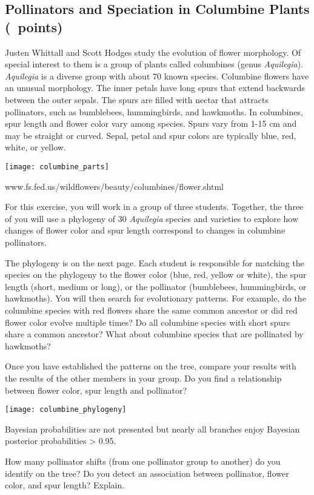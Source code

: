 \documentclass[11pt, addpoints]{exam}
\begin{document}
\subsection*{Pollinators and Speciation in Columbine Plants (\numpoints\ points)}

Justen Whittall and Scott Hodges study the evolution of flower
morphology. Of special interest to them is a group of plants called
columbines (genus \textit{Aquilegia}). \textit{Aquilegia} is a diverse group
with about 70 known species. Columbine flowers have an unusual
morphology. The inner petals have long spurs that extend backwards
between the outer sepals. The spurs are filled with nectar that attracts
pollinators, such as bumblebees, hummingbirds, and hawkmoths. In
columbines, spur length and flower color vary among species. Spurs vary from
1-15 cm and may be straight or curved. Sepal, petal and spur colors are
typically blue, red, white, or yellow.

\begin{center}
	\texttt{[image: columbine\_parts]}

	{\footnotesize
	www.fs.fed.us/wildflowers/beauty/columbines/flower.shtml}
\end{center}

For this exercise, you will work in a group of three students. Together,
the three of you will use a phylogeny of 30 \textit{Aquilegia} species and
varieties to explore how changes of flower color and spur length
correspond to changes in columbine pollinators.

The phylogeny is on the next page. Each student is responsible for
matching the species on the phylogeny to the flower color (blue, red,
yellow or white), the spur length (short, medium or long), or the
pollinator (bumblebees, hummingbirds, or hawkmoths). You will then
search for evolutionary patterns. For example, do the columbine species
with red flowers share the same common ancestor or did red flower color
evolve multiple times? Do all columbine species with short spurs share a
common ancestor? What about columbine species that are pollinated by
hawkmoths?

Once you have established the patterns on the tree, compare your results
with the results of the other members in your group. Do you find a
relationship between flower color, spur length and pollinator?

\begin{center}
	\texttt{[image: columbine\_phylogeny]}

	{\footnotesize Bayesian probabilities are not presented but nearly all branches enjoy
	Bayesian posterior probabilities \textgreater{} 0.95.}
\end{center}

\begin{questions}

\question[5]
How many pollinator shifts (from one pollinator group to
another) do you identify on the tree? Do you detect an 
association between pollinator, flower color, and spur length? Explain. 


\end{questions}
\end{document}
